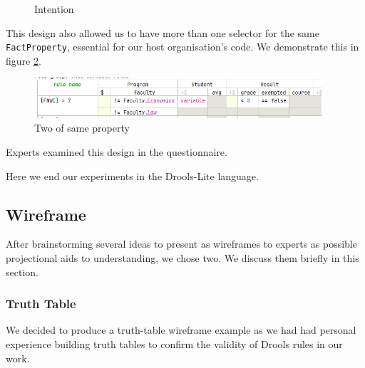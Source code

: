 \begin{figure}
    \centering
    \caption{Intention}
    \label{fig:SpreadsheetIntentions}
\end{figure}

This design also allowed us to have more than one selector for the same \texttt{FactProperty}, essential for our host organisation's code.
We demonstrate this in figure \ref{fig:TwoProperties}.

\begin{figure}
    \centering
    \includegraphics[width=0.95\textwidth]{Sections/images/spreadsheetTwoProperties.png} 
    \caption{Two of same property}
    \label{fig:TwoProperties}
\end{figure}

Experts examined this design in the questionnaire.

Here we end our experiments in the Drools-Lite language.

\subsection{Wireframe}

After brainstorming several ideas to present as wireframes to experts as possible projectional aids to understanding, we chose two.
We discuss them briefly in this section.

\subsubsection{Truth Table}
We decided to produce a truth-table wireframe example as we had had personal experience building truth tables to confirm the validity of Drools rules in our work.

